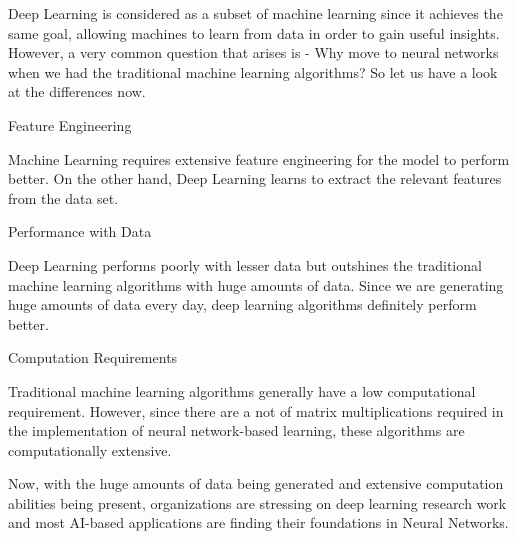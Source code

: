 Deep Learning is considered as a subset of machine learning since it achieves the same goal, allowing machines to learn from data in order to gain useful insights. However, a very common question that arises is - Why move to neural networks when we had the traditional machine learning algorithms? So let us have a look at the differences now.

	\begin{numberedlist}
		\item Feature Engineering
		\begin{bulletedlist}
			\item Machine Learning requires extensive feature engineering for the model to perform better. On the other hand, Deep Learning learns to extract the relevant features from the data set.
		\end{bulletedlist}
		\item Performance with Data
		\begin{bulletedlist}
			\item Deep Learning performs poorly with lesser data but outshines the traditional machine learning algorithms with huge amounts of data. Since we are generating huge amounts of data every day, deep learning algorithms definitely perform better.
		\end{bulletedlist}
		\item Computation Requirements
		\begin{bulletedlist}
			\item Traditional machine learning algorithms generally have a low computational requirement. However, since there are a not of matrix multiplications required in the implementation of neural network-based learning, these algorithms are computationally extensive.
		\end{bulletedlist}
	\end{numberedlist}

Now, with the huge amounts of data being generated and extensive computation abilities being present, organizations are stressing on deep learning research work and most AI-based applications are finding their foundations in Neural Networks.
